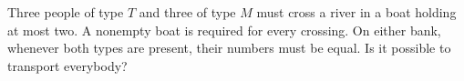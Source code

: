 Three people of type $T$ and three of type $M$ must cross a river in a boat holding at most two. A nonempty boat is required for every crossing. On either bank, whenever both types are present, their numbers must be equal. Is it possible to transport everybody?
